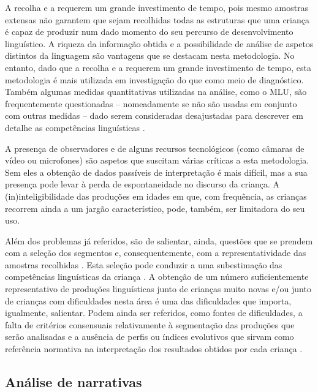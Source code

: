 \documentclass[output=paper]{LSP/langsci}
\begin{document}
A recolha e a  requerem um grande investimento de tempo, pois mesmo amostras extensas não garantem que sejam recolhidas todas as estruturas que uma criança é capaz de produzir num dado momento do seu percurso de desenvolvimento linguístico. A riqueza da informação obtida e a possibilidade de análise de aspetos distintos da linguagem são vantagens que se destacam nesta metodologia. No entanto, dado que a recolha e a  requerem um grande investimento de tempo, esta metodologia é mais utilizada em investigação do que como meio de diagnóstico. Também algumas medidas quantitativas utilizadas na análise, como o MLU, são frequentemente questionadas – nomeadamente se não são usadas em conjunto com outras medidas – dado serem consideradas desajustadas para descrever em detalhe as competências linguísticas \citep{lee1974,leecanter1971,nelson1973,owens2012}. 

A presença de observadores e de alguns recursos tecnológicos (como câmaras de vídeo ou microfones) são aspetos que suscitam várias críticas a esta metodologia. Sem eles a obtenção de dados passíveis de interpretação é mais difícil, mas a sua presença pode levar à perda de espontaneidade no discurso da criança. A (in)inteligibilidade das produções em idades em que, com frequência, as crianças recorrem ainda a um jargão característico, pode, também, ser limitadora do seu uso.

Além dos problemas já referidos, são de salientar, ainda, questões que se prendem com a seleção dos segmentos e, consequentemente, com a representatividade das amostras recolhidas \citep{owens2012}. Esta seleção pode conduzir a uma subestimação das competências linguísticas da criança \citep{demuth1998}. A obtenção de um número suficientemente representativo de produções linguísticas junto de crianças muito novas e/ou junto de crianças com dificuldades nesta área é uma das dificuldades que importa, igualmente, salientar. Podem ainda ser referidos, como fontes de dificuldades, a falta de critérios consensuais relativamente à segmentação das produções que serão analisadas e a ausência de perfis ou índices evolutivos que sirvam como referência normativa na interpretação dos resultados obtidos por cada criança \citep{acosta2006}. 

\subsection{Análise de narrativas}
\label{subsec:viana_analise_narrativas}
\end{document}
